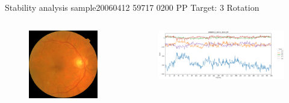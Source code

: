 \documentclass{beamer}
\begin{document}
\begin{frame}{Stability analysis sample}{20060412 59717 0200 PP Target: 3 Rotation}
\begin{columns}
\begin{column}{0.3\textwidth}
\begin{figure}[p]
	\centering
	\includegraphics[width=\textwidth]{chapter_stability/20060412_59717_0200_PP/20060412_59717_0200_PP.jpeg}
\end{figure}	
\end{column}
\begin{column}{0.45\textwidth}  %
\begin{figure}[p]
	\centering
	\includegraphics[width=\textwidth]{chapter_stability/20060412_59717_0200_PP/r/scores.png}
\end{figure}
\centering
\href{run:videos_stability/Messidor_20060412_59717_0200_PP_Target_3_Checking_Rotation_Sensitivity.mp4}{\color{blue}{Rotation Visualization}} 
\end{column}
\end{columns}
\end{frame}
\end{document}
